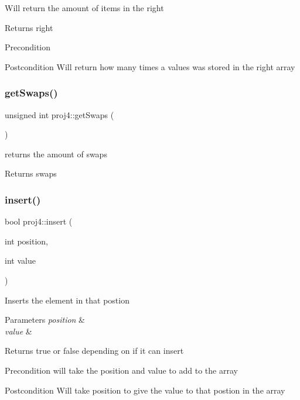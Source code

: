 Will return the amount of items in the right \begin{DoxyReturn}{Returns}
right 
\end{DoxyReturn}
\begin{DoxyPrecond}{Precondition}

\end{DoxyPrecond}
\begin{DoxyPostcond}{Postcondition}
Will return how many times a values was stored in the right array 
\end{DoxyPostcond}
\mbox{\label{classproj4_a0a8c2239f67a3b980e0c3ce7d30bc49e}} 
\subsubsection{\texorpdfstring{get\+Swaps()}{getSwaps()}}
{\footnotesize\ttfamily unsigned int proj4\+::get\+Swaps (\begin{DoxyParamCaption}{ }\end{DoxyParamCaption})}



returns the amount of swaps 

\begin{DoxyReturn}{Returns}
swaps 
\end{DoxyReturn}
\mbox{\label{classproj4_ac11ae7e2ea8ae9432a6ed87a458c1bd5}} 
\subsubsection{\texorpdfstring{insert()}{insert()}}
{\footnotesize\ttfamily bool proj4\+::insert (\begin{DoxyParamCaption}\item[{int}]{position,  }\item[{int}]{value }\end{DoxyParamCaption})}

Inserts the element in that postion 
\begin{DoxyParams}{Parameters}
{\em position} & \\
\hline
{\em value} & \\
\hline
\end{DoxyParams}
\begin{DoxyReturn}{Returns}
true or false depending on if it can insert 
\end{DoxyReturn}
\begin{DoxyPrecond}{Precondition}
will take the position and value to add to the array 
\end{DoxyPrecond}
\begin{DoxyPostcond}{Postcondition}
Will take position to give the value to that postion in the array 
\end{DoxyPostcond}
\mbox{\label{classproj4_a21e0a4c4dd81cf67a25d0ab62370ab5e}} 
